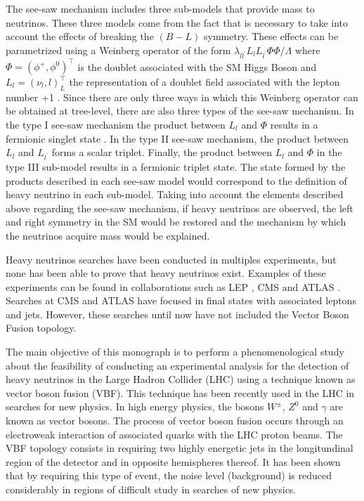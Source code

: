 The see-saw mechanism includes three sub-models that provide mass to neutrinos. These three models come from the fact that is necessary to take into account the effects of breaking the $(B-L)$ symmetry. These effects can be parametrized using a Weinberg operator of the form $\lambda_{ll^{\prime}}L_{l}L_{l^{\prime}}\Phi\Phi/\Lambda$ where $\Phi = (\phi^{+}, \phi^{0})^{\intercal}$ is the doublet associated with the SM Higgs Boson and $L_{l} = (\nu_{l},l)_{L}^{\intercal}$ the representation of a doublet field associated with the lepton number +1 \cite{See-saw}. Since there are only three ways in which this Weinberg operator can be obtained at tree-level, there are also three types of the see-saw mechanism. In the type I see-saw mechanism the product between $L_{l}$ and $\Phi$ results in a fermionic singlet state . In the type II see-saw mechanism, the product between $L_{l}$ and $L_{l^{\prime}}$ forms a scalar triplet. Finally, the product between $L_{l}$ and $\Phi$ in the type III sub-model results in a fermionic triplet state. The state formed by the products described in each see-saw model would correspond to the definition of heavy neutrino in each sub-model. Taking into account the elements described above regarding the see-saw mechanism, if heavy neutrinos are observed, the left and right symmetry in the SM would be restored and the mechanism by which the neutrinos acquire mass would be explained.

Heavy neutrinos searches have been conducted in multiples experiments, but none has been able to prove that heavy neutrinos exist. Examples of these experiments can be found in collaborations such as LEP \cite{LEP}, CMS and ATLAS \cite{CMS ATLAS}. Searches at CMS and ATLAS have focused in final states with associated leptons and jets. However, these searches until now have not included the Vector Boson Fusion topology.

The main objective of this monograph is to perform a phenomenological study about the feasibility of conducting an experimental analysis for the detection of heavy neutrinos in the Large Hadron Collider (LHC) using a technique known as vector boson fusion (VBF). This technique has been recently used in the LHC \cite{VBF Search} in searches for new physics. In high energy physics, the bosons $W^{\pm}$, $Z^{0}$ and $\gamma$ are known as vector bosons. The process of vector boson fusion occurs through an electroweak interaction of associated quarks with the LHC proton beams. The VBF topology consists in requiring two highly energetic jets in the longitundinal region of the detector and in opposite hemispheres thereof. It has been shown that by requiring this type of event, the noise level (background) is reduced considerably in regions of difficult study in searches of new physics.


